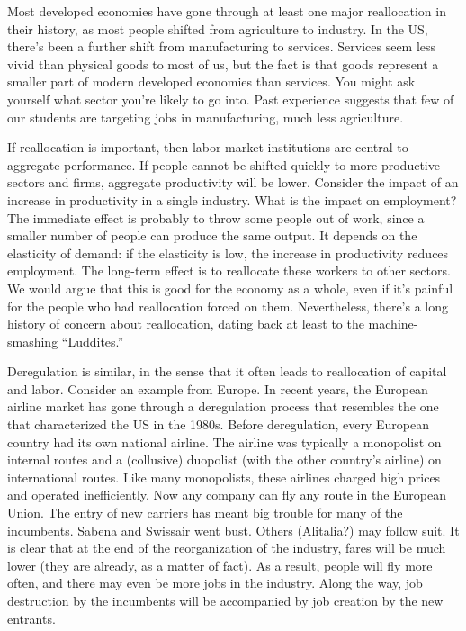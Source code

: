 \documentclass[letterpaper,12pt]{article}
\begin{document}
Most developed economies have gone through at least one
major reallocation in their history,
as most people shifted from agriculture to industry.
In the US, there's been a further shift from manufacturing to services.
Services seem less vivid than physical goods to most of us,
but the fact is that goods represent a smaller part of modern
developed economies than services.
You might ask yourself what sector you're likely to go into.
Past experience suggests that few of our students are targeting jobs
in manufacturing, much less agriculture.

If reallocation is important,
then labor market institutions are central to aggregate performance.
If people cannot be shifted quickly to more productive sectors
and firms, aggregate productivity will be lower.
Consider the impact of an increase in productivity in a single industry.
What is the impact on employment?
The immediate effect is probably to throw some people out of work, since
a smaller number of people can produce the same output.
It depends on the elasticity of demand:  if the elasticity is low,
the increase in productivity reduces employment.
The long-term effect is to reallocate these workers
to other sectors.
We would argue that this is good for the economy as a whole,
even if it's painful for the people who had reallocation forced on them.
Nevertheless, there's a long history of concern about reallocation,
dating back at least to the machine-smashing ``Luddites.''


Deregulation is similar, in the sense that it often leads to reallocation of capital and labor.  Consider an example from Europe. In recent years, the European
airline market has gone through a deregulation process that
resembles the one that characterized the US in the 1980s. Before
deregulation, every European country had its own national airline.
The airline was typically a monopolist on internal routes and a
(collusive) duopolist (with the other country's airline) on
international routes.  Like many monopolists, these airlines
charged high prices and operated inefficiently.  Now any company
can fly any route in the European Union. The entry of new carriers
has meant big trouble
for many of the incumbents. Sabena and Swissair went bust. Others
(Alitalia?) may follow suit. It is clear that at the end
of the reorganization of the industry, fares will be much lower
(they are already, as a matter of fact).
As a result, people will fly more often,
 and there may even be more jobs in the industry.
 Along the way, job destruction by the incumbents will be
 accompanied by job creation by the new entrants.
\end{document}

